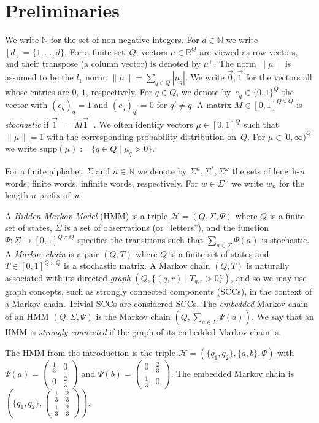 \documentclass[a4paper,UKenglish,cleveref, autoref,mathscr]{lipics-v2019}
\newcommand{\RR}{\mathbb{R}}
\newcommand{\NN}{\mathbb{N}}
\newcommand{\QQ}{\mathbb{Q}}
\newcommand{\1}{\mathbbm{1}}
\newcommand{\supp}{\mathrm{supp}}
\renewcommand{\H}{\mathcal{H}}
\begin{document}
\section{Preliminaries} \label{sec:prelims}
We write $\NN$ for the set of non-negative integers. %
For $d \in \NN$ we write %
$[d] = \{1, \dots, d\}$. %
For a finite set~$Q$, vectors $\mu \in \RR^Q$ are viewed as row vectors, and their transpose (a column vector) is denoted by $\mu^\top$.
The norm $\|\mu\|$ is assumed to be the $l_1$ norm: $\| \mu \| = \sum_{q \in Q} | \mu_q |$.
We write $\vec{0}, \vec{1}$ for the vectors all whose entries are $0$, $1$, respectively.
For $q \in Q$, we denote by~$e_q \in \{0,1\}^Q$ the vector with $(e_q)_q = 1$ and $(e_q)_{q'} = 0$ for $q' \ne q$.
A matrix $M \in [0,1]^{Q \times Q}$ is \emph{stochastic} if $\vec{1}^\top = M \vec{1}^\top$.
We often identify vectors $\mu \in [0,1]^Q$ such that $\| \mu \| = 1$ with the corresponding probability distribution on~$Q$.
For $\mu \in [0,\infty)^Q$ we write $\supp(\mu) := \{q \in Q \mid \mu_q > 0\}$.

For a finite alphabet~$\Sigma$ and $n \in \NN$ we denote by $\Sigma^n, \Sigma^*, \Sigma^\omega$ the sets of length-$n$ words, finite words, infinite words, respectively.
For $w \in \Sigma^\omega$ we write $w_n$ for the length-$n$ prefix of~$w$.

A \emph{Hidden Markov Model} (HMM) is a triple $\H = (Q, \Sigma, \Psi)$ where $Q$ is a finite set of states, $\Sigma$ is a set of observations (or ``letters''), and the function $\Psi : \Sigma \rightarrow [0,1]^{Q \times Q}$ specifies the transitions such that $\sum_{a \in \Sigma} \Psi(a)$ is stochastic.
A \emph{Markov chain} is a pair $(Q, T)$ where $Q$ is a finite set of states and $T \in [0,1]^{Q \times Q}$ is a stochastic matrix.
A Markov chain $(Q,T)$ is naturally associated with its directed \emph{graph} $(Q,\{(q,r) \mid T_{q,r} > 0\})$, and so we may use graph concepts, such as strongly connected components (SCCs), in the context of a Markov chain. Trivial SCCs are considered SCCs.
The \emph{embedded} Markov chain of an HMM $(Q, \Sigma, \Psi)$ is the Markov chain $(Q, \sum_{a \in \Sigma} \Psi(a))$.
We say that an HMM is \emph{strongly connected} if the graph of its embedded Markov chain is.
\begin{example} \label{ex-HMMdef}
The HMM from the introduction is the triple $\H = (\{q_1, q_2\}, \{a,b\}, \Psi)$ with $\Psi(a) = \begin{pmatrix} \frac13 & 0 \\ 0 & \frac23 \end{pmatrix}$ and $\Psi(b) = \begin{pmatrix} 0 & \frac23 \\ \frac13 & 0 \end{pmatrix}$.
The embedded Markov chain is $(\{q_1,q_2\}, \begin{pmatrix} \frac13 & \frac23 \\ \frac13 & \frac23 \end{pmatrix})$.
\end{example}
\end{document}
